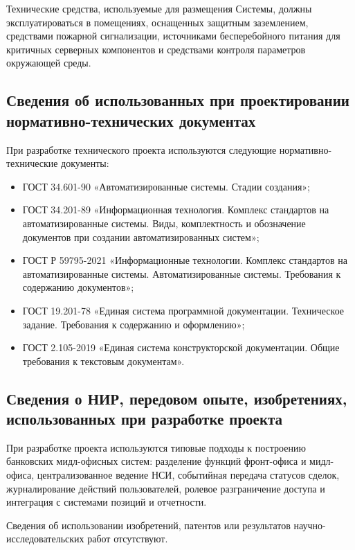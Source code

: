 \documentclass[a4paper,14pt]{extarticle}
\begin{document}
Технические средства, используемые для размещения Системы, должны эксплуатироваться в помещениях, оснащенных защитным заземлением, средствами пожарной сигнализации, источниками бесперебойного питания для критичных серверных компонентов и средствами контроля параметров окружающей среды.

\subsection{Сведения об использованных при проектировании нормативно-технических документах}
При разработке технического проекта используются следующие нормативно-технические документы:
\begin{itemize}[itemsep=1mm]
  \item ГОСТ 34.601-90 «Автоматизированные системы. Стадии создания»;
  \item ГОСТ 34.201-89 «Информационная технология. Комплекс стандартов на автоматизированные системы. Виды, комплектность и обозначение документов при создании автоматизированных систем»;
  \item ГОСТ Р 59795-2021 «Информационные технологии. Комплекс стандартов на автоматизированные системы. Автоматизированные системы. Требования к содержанию документов»;
  \item ГОСТ 19.201-78 «Единая система программной документации. Техническое задание. Требования к содержанию и оформлению»;
  \item ГОСТ 2.105-2019 «Единая система конструкторской документации. Общие требования к текстовым документам».
\end{itemize}

\subsection{Сведения о НИР, передовом опыте, изобретениях, использованных при разработке проекта}
При разработке проекта используются типовые подходы к построению банковских мидл-офисных систем: разделение функций фронт-офиса и мидл-офиса, централизованное ведение НСИ, событийная передача статусов сделок, журналирование действий пользователей, ролевое разграничение доступа и интеграция с системами позиций и отчетности.

Сведения об использовании изобретений, патентов или результатов научно-исследовательских работ отсутствуют.
\end{document}
